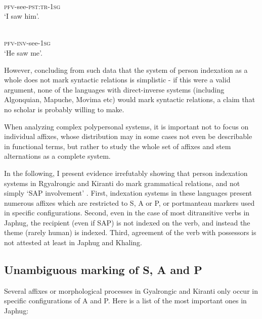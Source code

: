 \documentclass[oldfontcommands,oneside,a4paper,11pt]{article}
\newcommand{\ipa}[1]{{\phon \mbox{#1}}} %
\begin{document}
\begin{exe}
\ex \label{ex:pWmtota}
\gll \ipa{pɯ-mto-t-a} \\
\textsc{pfv}-see-\textsc{pst:tr}-\textsc{1sg} \\
\glt `I saw him'.
\end{exe}


\begin{exe}
\ex \label{ex:pWwGmtoa}
\gll \ipa{pɯ́-wɣ-mto-a} \\
\textsc{pfv}-\textsc{inv}-see-\textsc{1sg} \\
\glt `He saw me'.
\end{exe}

However, concluding from such data that the system of person indexation as a whole does not mark syntactic relations is simplistic - if this were a valid argument, none of the languages with direct-inverse systems (including Algonquian, Mapuche, Movima etc) would mark syntactic relations, a claim that no scholar is probably willing to make. 

When analyzing complex polypersonal systems, it is important not to focus on individual affixes, whose distribution may in some cases not even be describable in functional terms, but rather to study the whole set of affixes and stem alternations as a complete system. 

In the following, I present evidence irrefutably showing that person indexation systems in Rgyalrongic and Kiranti do mark grammatical relations, and not simply `SAP involvement' . First, indexation systems in these languages present numerous affixes which are restricted to S, A or P, or portmanteau markers used in specific configurations. Second, even in the case of most ditransitive verbs in Japhug, the recipient (even if SAP) is not indexed on the verb, and instead the theme (rarely human) is indexed. Third, agreement of the verb with possessors is not attested at least in Japhug and Khaling.

\subsection{Unambiguous marking of S, A and P}
Several affixes or morphological processes in Gyalrongic and Kiranti only occur  in specific configurations of A and P. Here is a list of the most important ones in Japhug:
\end{document}
